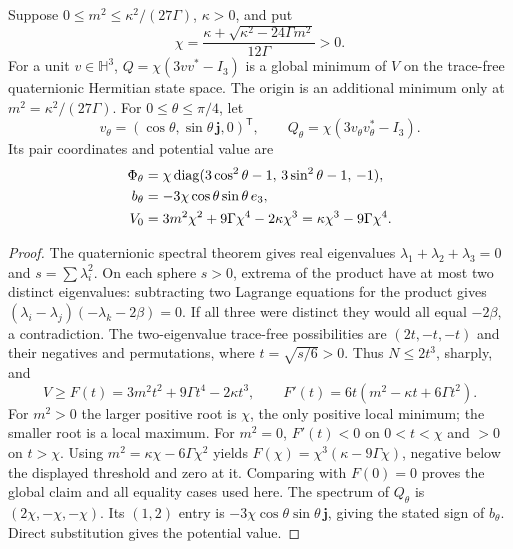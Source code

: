 \begin{lemma}\label{q444:vk-vacuum}
Suppose \(0\leq m^2\leq\kappa^2/(27\Gamma)\), \(\kappa>0\), and put
\[
 \chi=\frac{\kappa+\sqrt{\kappa^2-24\Gamma m^2}}{12\Gamma}>0 .
\]
For a unit \(v\in\mathbb H^3\), \(Q=\chi(3vv^*-I_3)\) is a global
minimum of \(V\) on the trace-free quaternionic Hermitian state space.
The origin is an additional minimum only at
\(m^2=\kappa^2/(27\Gamma)\).
For \(0\leq\theta\leq\pi/4\), let
\[
 v_\theta=(\cos\theta,\sin\theta\,\mathbf j,0)^{\mathsf T},
 \qquad Q_\theta=\chi(3v_\theta v_\theta^*-I_3).
\]
Its pair coordinates and potential value are
\begin{align}
 \Phi_\theta&=\chi\operatorname{diag}
     (3\cos^2\theta-1,\,3\sin^2\theta-1,\,-1),\notag\\
 b_\theta&=-3\chi\cos\theta\sin\theta\,e_3,\label{q444:vk-curve}\\
 V_0&=3m^2\chi^2+9\Gamma\chi^4-2\kappa\chi^3
      =\kappa\chi^3-9\Gamma\chi^4 .\notag
\end{align}
\end{lemma}
\begin{proof}
The quaternionic spectral theorem gives real eigenvalues
\(\lambda_1+\lambda_2+\lambda_3=0\) and
\(s=\sum\lambda_i^2\). On each sphere \(s>0\), extrema of the product
have at most two distinct eigenvalues: subtracting two Lagrange equations
for the product gives
\((\lambda_i-\lambda_j)(-\lambda_k-2\beta)=0\).
If all three were distinct they would all equal \(-2\beta\), a
contradiction. The two-eigenvalue trace-free possibilities are
\((2t,-t,-t)\) and their negatives and permutations, where
\(t=\sqrt{s/6}>0\). Thus \(N\leq2t^3\), sharply, and
\[
 V\geq F(t)=3m^2t^2+9\Gamma t^4-2\kappa t^3,\qquad
 F'(t)=6t(m^2-\kappa t+6\Gamma t^2).
\]
For \(m^2>0\) the larger positive root is \(\chi\), the only positive
local minimum; the smaller root is a local maximum. For \(m^2=0\),
\(F'(t)<0\) on \(0<t<\chi\) and \(>0\) on \(t>\chi\).
Using \(m^2=\kappa\chi-6\Gamma\chi^2\) yields
\(F(\chi)=\chi^3(\kappa-9\Gamma\chi)\), negative below the displayed
threshold and zero at it. Comparing with \(F(0)=0\) proves the global
claim and all equality cases used here. The spectrum of \(Q_\theta\)
is \((2\chi,-\chi,-\chi)\). Its \((1,2)\) entry is
\(-3\chi\cos\theta\sin\theta\,\mathbf j\), giving the stated sign of
\(b_\theta\). Direct substitution gives the potential value.
\end{proof}

